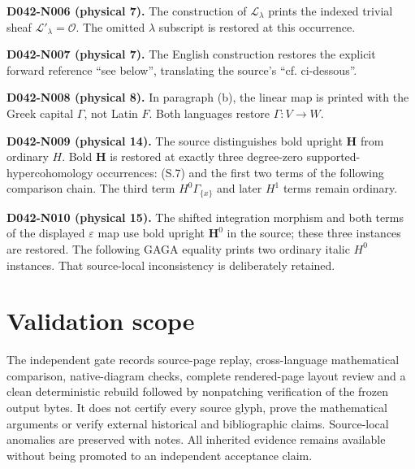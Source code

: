 \documentclass[11pt,leqno]{article}
\newcommand{\OO}{\mathcal O}
\begin{document}
\noindent\textbf{D042-N006 (physical 7).} The construction of $\mathscr L_\lambda$ prints the indexed trivial sheaf $\mathscr L'_\lambda=\OO$. The omitted $\lambda$ subscript is restored at this occurrence.\par

\noindent\textbf{D042-N007 (physical 7).} The English construction restores the explicit forward reference ``see below'', translating the source's ``cf. ci-dessous''.\par

\noindent\textbf{D042-N008 (physical 8).} In paragraph (b), the linear map is printed with the Greek capital $\Gamma$, not Latin $F$. Both languages restore $\Gamma:V\to W$.\par

\noindent\textbf{D042-N009 (physical 14).} The source distinguishes bold upright $\mathbf H$ from ordinary $H$. Bold $\mathbf H$ is restored at exactly three degree-zero supported-hypercohomology occurrences: (S.7) and the first two terms of the following comparison chain. The third term $H^0\Gamma_{\{x\}}$ and later $H^1$ terms remain ordinary.\par

\noindent\textbf{D042-N010 (physical 15).} The shifted integration morphism and both terms of the displayed $\varepsilon$ map use bold upright $\mathbf H^0$ in the source; these three instances are restored. The following GAGA equality prints two ordinary italic $H^0$ instances. That source-local inconsistency is deliberately retained.\par

\section*{Validation scope}
The independent gate records source-page replay, cross-language mathematical
comparison, native-diagram checks, complete rendered-page layout review and a
clean deterministic rebuild followed by nonpatching verification of the frozen
output bytes. It does not certify every source glyph, prove the mathematical
arguments or verify external historical and bibliographic claims. Source-local
anomalies are preserved with notes. All inherited evidence remains available
without being promoted to an independent acceptance claim.
\end{document}
